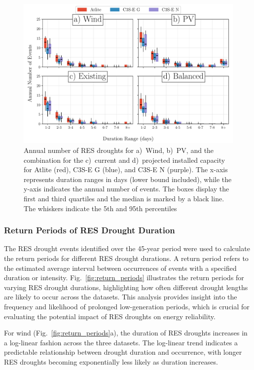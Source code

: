 \documentclass[a4paper, 11pt]{article}
\begin{document}
\begin{figure}[!ht]
	\centering
	\includegraphics[width=\textwidth]{droughts_number_events}
	\caption{Annual number of RES droughts for a)~Wind, b)~PV, and the combination for the c)~current and d)~projected installed capacity for Atlite (red), C3S-E G (blue), and C3S-E N (purple). The x-axis represents duration ranges in days (lower bound included), while the y-axis indicates the annual number of events. The boxes display the first and third quartiles and the median is marked by a black line. The whiskers indicate the 5th and 95th percentiles}
	\label{fig:boxplot_number_events}	
\end{figure}

\newpage
\subsubsection{Return Periods of RES Drought Duration}

The RES drought events identified over the 45-year period were used to calculate the return periods for different RES drought durations. A return period refers to the estimated average interval between occurrences of events with a specified duration or intensity. Fig.~\ref{fig:return_periods} illustrates the return periods for varying RES drought durations, highlighting how often different drought lengths are likely to occur across the datasets. This analysis provides insight into the frequency and likelihood of prolonged low-generation periods, which is crucial for evaluating the potential impact of RES droughts on energy reliability.

For wind (Fig.~\ref{fig:return_periods}a), the duration of RES droughts increases in a log-linear fashion across the three datasets. The log-linear trend indicates a predictable relationship between drought duration and occurrence, with longer RES droughts becoming exponentially less likely as duration increases. 
\end{document}
